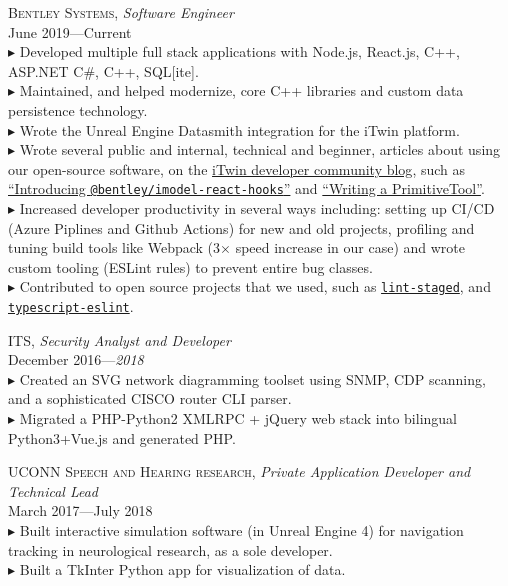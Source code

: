 \documentclass[Letterpaper,11pt]{article}
\newcommand{\bul}{$\blacktriangleright$ }
\begin{document}
    \textsc{Bentley Systems},
    \textit{Software Engineer}\\
    June 2019---Current\\
        \bul Developed multiple full stack applications with Node.js, React.js, C++, ASP.NET C\#, C++, SQL[ite].
        \\
        \bul Maintained, and helped modernize, core C++ libraries and custom data persistence technology.
        \\
        \bul Wrote the Unreal Engine Datasmith integration for the iTwin platform.
        \\
        \bul Wrote several public and internal, technical and beginner, articles about using our open-source
        software, on the \href{https://medium.com/itwinjs/community/home}{iTwin developer community blog}, such as
\href{https://medium.com/itwinjs/introducing-bentley-imodel-react-hooks-8945a72711d2}{``Introducing \texttt{@bentley/imodel-react-hooks}''} and
         \href{https://medium.com/itwinjs/writing-a-primitivetool-a044647f7f66}{``Writing a PrimitiveTool''}.
        \\
        \bul Increased developer productivity in several ways including: setting up CI/CD (Azure Piplines and Github Actions) for new and old projects, profiling and tuning build tools like Webpack (3$\times$ speed increase in our case) and wrote custom tooling (ESLint rules) to prevent entire bug classes.
        \\
        \bul Contributed to open source projects that we used, such as \href{https://github.com/okonet/lint-staged}{\texttt{lint-staged}}, and \href{https://github.com/typescript-eslint/typescript-eslint}{\texttt{typescript-eslint}}.

    \textsc{ITS},
    \textit{Security Analyst and Developer}\\
    December 2016---\textit{2018}\\
        \bul Created an SVG network diagramming toolset using SNMP, CDP scanning,
        and a sophisticated CISCO router CLI parser.\\
        \bul Migrated a PHP-Python2 XMLRPC + jQuery web stack into bilingual Python3+Vue.js
        and generated PHP.

    \textsc{UCONN Speech and Hearing research},
    \textit{Private Application Developer and Technical Lead}\\
    March 2017---July 2018\\
        \bul Built interactive simulation software (in Unreal Engine 4)
        for navigation tracking in neurological research, as a sole developer.
        \\
        \bul Built a TkInter Python app for visualization of data.
        
\end{document}
